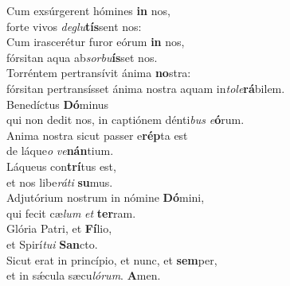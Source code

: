 \evenverse Cum exsúrgerent hómines \textbf{in} nos,~\*\\
\evenverse forte vivos \textit{de}\textit{glu}\textbf{tís}sent nos:\\
\oddverse Cum irascerétur furor eórum \textbf{in} nos,~\*\\
\oddverse fórsitan aqua ab\textit{sor}\textit{bu}\textbf{ís}set nos.\\
\evenverse Torréntem pertransívit ánima \textbf{no}stra:~\*\\
\evenverse fórsitan pertransísset ánima nostra aquam in\textit{to}\textit{le}\textbf{rá}bilem.\\
\oddverse Benedíctus \textbf{Dó}minus~\*\\
\oddverse qui non dedit nos, in captiónem dénti\textit{bus} \textit{e}\textbf{ó}rum.\\
\evenverse Anima nostra sicut passer e\textbf{rép}ta est~\*\\
\evenverse de láque\textit{o} \textit{ve}\textbf{nán}tium.\\
\oddverse Láqueus con\textbf{trí}tus est,~\*\\
\oddverse et nos libe\textit{rá}\textit{ti} \textbf{su}mus.\\
\evenverse Adjutórium nostrum in nómine \textbf{Dó}mini,~\*\\
\evenverse qui fecit cæ\textit{lum} \textit{et} \textbf{ter}ram.\\
\oddverse Glória Patri, et \textbf{Fí}lio,~\*\\
\oddverse et Spirí\textit{tu}\textit{i} \textbf{San}cto.\\
\evenverse Sicut erat in princípio, et nunc, et \textbf{sem}per,~\*\\
\evenverse et in sǽcula sæcu\textit{ló}\textit{rum}. \textbf{A}men.\\
